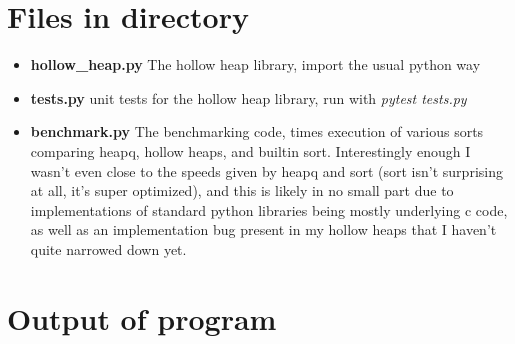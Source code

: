 \documentclass[10pt]{article}
\begin{document}
\section*{Files in directory}
\begin{itemize}
    \item \textbf{hollow\_heap.py}
        The hollow heap library, import the usual python way
    \item \textbf{tests.py}
        unit tests for the hollow heap library, run with \emph{pytest tests.py}
    \item \textbf{benchmark.py}
        The benchmarking code, times execution of various sorts comparing heapq, hollow heaps, and builtin sort. Interestingly enough I wasn't even close to the speeds given by heapq and sort (sort isn't surprising at all, it's super optimized), and this is likely in no small part due to implementations of standard python libraries being mostly underlying c code, as well as an implementation bug present in my hollow heaps that I haven't quite narrowed down yet.

\end{itemize}

\section*{Output of program}

{}

\end{document}
